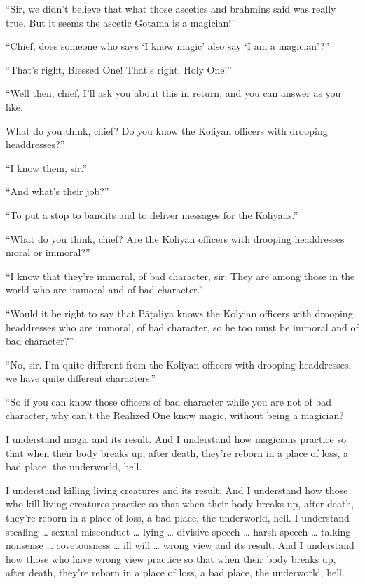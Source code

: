 \documentclass[12pt,openany]{book}%
\begin{document}
“Sir, we didn’t believe that what those ascetics and brahmins said was really true. But it seems the ascetic Gotama is a magician!” 

“Chief, does someone who says ‘I know magic’ also say ‘I am a magician’?” 

“That’s right, Blessed One! That’s right, Holy One!” 

“Well then, chief, I’ll ask you about this in return, and you can answer as you like. 

What do you think, chief? Do you know the Koliyan officers with drooping headdresses?” 

“I know them, sir.” 

“And what’s their job?” 

“To put a stop to bandits and to deliver messages for the Koliyans.” 

“What do you think, chief? Are the Koliyan officers with drooping headdresses moral or immoral?” 

“I know that they’re immoral, of bad character, sir. They are among those in the world who are immoral and of bad character.” 

“Would it be right to say that \textsanskrit{Pāṭaliya} knows the Kolyian officers with drooping headdresses who are immoral, of bad character, so he too must be immoral and of bad character?” 

“No, sir. I’m quite different from the Koliyan officers with drooping headdresses, we have quite different characters.” 

“So if you can know those officers of bad character while you are not of bad character, why can’t the Realized One know magic, without being a magician? 

I understand magic and its result. And I understand how magicians practice so that when their body breaks up, after death, they’re reborn in a place of loss, a bad place, the underworld, hell. 

I understand killing living creatures and its result. And I understand how those who kill living creatures practice so that when their body breaks up, after death, they’re reborn in a place of loss, a bad place, the underworld, hell. I understand stealing … sexual misconduct … lying … divisive speech … harsh speech … talking nonsense … covetousness … ill will … wrong view and its result. And I understand how those who have wrong view practice so that when their body breaks up, after death, they’re reborn in a place of loss, a bad place, the underworld, hell. 
\end{document}
